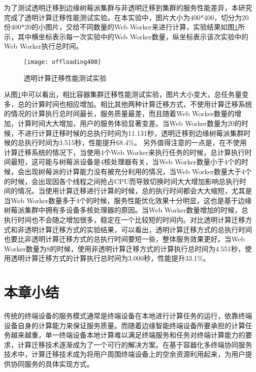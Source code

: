 为了测试透明迁移到边缘树莓派集群与非透明迁移到集群的服务性能差异，本研究完成了透明计算迁移性能测试实验。在本实验中，图片大小为400*400，切分为20份400*20的小图片，交给不同数量的Web Worker来进行计算，实验结果如图\ref{fig:computation_offloading_result_picture_400}所示，其中横坐标表示每一次实验中的Web Worker数量，纵坐标表示该次实验中的Web Worker执行总时间。

\begin{figure}[htbp]
    \centering
    \texttt{[image: offloading400]}
    \caption{透明计算迁移性能测试实验}
    \label{fig:computation_offloading_result_picture_400}
\end{figure}

从图\ref{fig:computation_offloading_result_picture_400}中可以看出，相比容器集群迁移性能测试实验，图片大小变大，总任务量变多，总的计算时间也相应增加。相比其他两种计算迁移方式，不使用计算迁移系统的情况的计算执行总时间最长，服务质量最差，而且随着Web Worker数量的增加，计算时间大大增加，用户的服务体验显著变差。当Web Worker数量为20的时候，不进行计算迁移时候的总执行时间为11.131秒，透明迁移到边缘树莓派集群时候的总执行时间为3.515秒，性能提升68.4\%。
另外值得注意的一点是，在不使用计算迁移系统的情况下，当使用4个Web Worker来执行任务的时候，总计算执行时间最短，这可能与树莓派设备是4核处理器有关，当Web Worker数量小于4个的时候，会出现树莓派的计算能力没有被充分利用的情况，当Web Worker数量大于4个的时候，会出现因各个线程之间抢占CPU而导致切换时间大大增加影响总执行时间的情况。当使用计算迁移进行计算的时候，总的执行时间都会大大缩短，尤其是当Web Worker数量多于4个的时候，服务性能优化效果十分明显，这也是基于边缘树莓派集群中拥有多设备多核处理器的原因。当Web Worker数量增加的时候，总执行时间也不会随之增加很多，稳定在一个比较短的时间内。对比透明计算迁移方式和非透明计算迁移方式的实验结果，可以看出，透明计算迁移方式的总执行时间也要比非透明计算迁移方式的总执行时间要短一些，整体服务效果更好。当Web Worker数量为8的时候，使用非透明计算迁移方式的计算执行总时间为4.551秒，使用透明计算迁移方式的计算执行总时间为3.000秒，性能提升33.1\%。

\section{本章小结}\label{sec:computation_offloading_summary}

传统的终端设备的服务模式通常是终端设备在本地进行计算任务的运行，依靠终端设备自身的计算能力来保证服务质量。而随着边缘智能终端设备所要承担的计算任务越来越重，单一终端设备本地计算难以满足终端服务和任务对终端计算能力的要求，计算迁移技术逐渐成为了一个可行的解决方案。在基于容器化多终端协同服务技术中，计算迁移技术成为将用户周围终端设备上的空余资源利用起来，为用户提供协同服务的具体实现方式。

